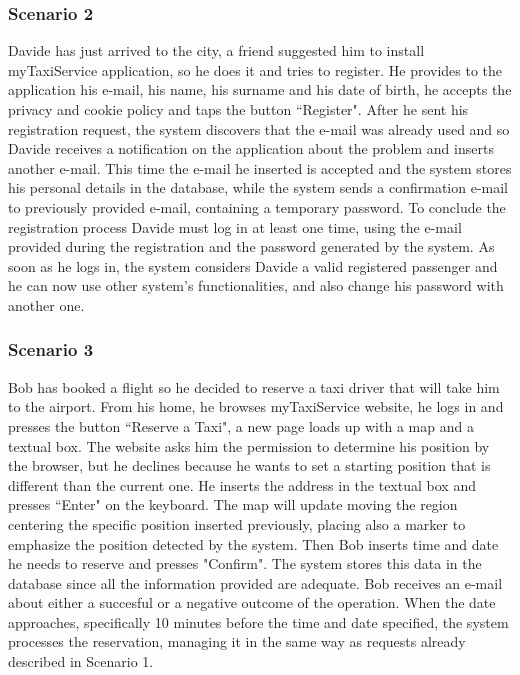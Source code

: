 \documentclass[a4paper,12pt]{article}%
\newcounter{func_req_counter}
\begin{document}
\subsubsection{Scenario 2}
Davide has just arrived to the city, a friend suggested him to install myTaxiService application, so he does it and tries to register.
He provides to the application his e-mail, his name, his surname and his date of birth, he accepts the privacy and cookie policy and taps the button ``Register". After he sent his registration request, the system discovers that the e-mail was already used and so Davide receives a notification on the application about the problem and inserts another e-mail.
This time the e-mail he inserted is accepted and the system stores his personal details in the database, while the system sends a confirmation e-mail to previously provided e-mail, containing a temporary password.
To conclude the registration process Davide must log in at least one time, using the e-mail provided during the registration and the password generated by the system.
As soon as he logs in, the system considers Davide a valid registered passenger and he can now use other system's functionalities, and also change his password with another one.  
\subsubsection{Scenario 3}
Bob has booked a flight so he decided to reserve a taxi driver that will take him to the airport.
From his home, he browses myTaxiService website, he logs in and presses the button ``Reserve a Taxi", a new page loads up with a map and a textual box.
The website asks him the permission to determine his position by the browser, but he declines because he wants to set a starting position that is different than the current one.
He inserts the address in the textual box and presses ``Enter" on the keyboard. The map will update moving the region centering the specific position inserted previously, placing also a marker to emphasize the position detected by the system.
Then Bob inserts time and date he needs to reserve and presses "Confirm".
The system stores this data in the database since all the information provided are adequate. Bob receives an e-mail about either a succesful or a negative outcome of the operation.
When the date approaches, specifically 10 minutes before the time and date specified, the system processes the reservation, managing it in the same way as requests already described in Scenario 1.  

\pagebreak
\end{document}

